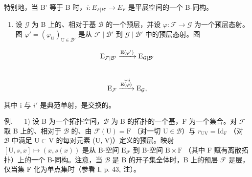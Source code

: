 特别地，当 B' 等于 B 时，\(i: E_{F|B'} \to E_F\) 是平展空间的一个 B-同构。

\begin{enumerate}
\def\labelenumi{\arabic{enumi})}
\setcounter{enumi}{1}
\tightlist
\item
  设 \(\mathcal{G}\) 为 B 上的、相对于基 \(\mathcal{B}\) 的一个预层，并设 \(\varphi\colon\mathcal{F}\to\mathcal{G}\) 为一个预层态射。图 \(\varphi'=(\varphi_{\mathrm{U}})_{\mathrm{U}\in\mathcal{B}'}\) 是从 \(\mathcal{F}\mid\mathcal{B}'\) 到 \(\mathcal{G}\mid\mathcal{B}'\) 中的预层态射。图
\end{enumerate}

\[
\begin{array}{c} \mathrm{E} _ {\mathcal {F} | \mathcal {B} ^ {\prime}} \xrightarrow {\mathrm{E} (\varphi^ {\prime})} \mathrm{E} _ {\mathcal {G} | \mathcal {B} ^ {\prime}} \\ \Biggl \downarrow_ {i} \\ \mathrm{E} _ {\mathcal {F}} \xrightarrow {\mathrm{E} (\varphi)} \mathrm{E} _ {\mathcal {G}}  , \end{array}
\]

其中 i 与 \(i'\) 是典范单射，是交换的。

例. --- 1) 设 B 为一个拓扑空间，\(\mathcal{B}\) 为 B 的拓扑的一个基，F 为一个集合。对 \(\mathcal{F}\) 取 B 上的、相对于 \(\mathcal{B}\) 的、由 \(\mathcal{F}(\mathrm{U}) = \mathrm{F}\) （对一切 \(\mathrm{U} \in \mathcal{B}\)）与 \(r_{\mathrm{UV}} = \mathrm{Id}_{\mathrm{F}}\) （对 \(\mathcal{B}\) 中满足 \(\mathrm{U} \subset \mathrm{V}\) 的每对元素 (U, V)）定义的预层。映射 \([\mathrm{U}, s, x] \mapsto (x, s(x))\) 是从 B-空间 \(\mathrm{E}_{\mathcal{F}}\) 到 B-空间 \(\mathrm{B} \times \mathrm{F}\) （其中 F 赋有离散拓扑）上的一个 B-同构。注意，当 \(\mathcal{B}\) 是 B 的开子集全体时，B 上的预层 \(\mathcal{F}\) 是层，仅当集 F 化为单点集时（参看 I, p. 43, 注）。

